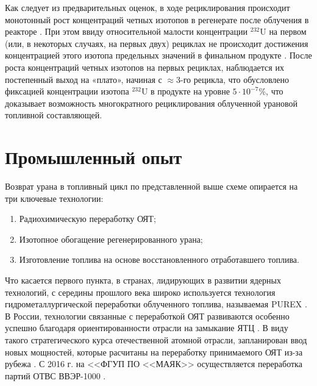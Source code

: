 Как следует из предварительных оценок, в ходе рециклирования происходит монотонный рост концентраций четных изотопов в регенерате после облучения в реакторе \cite{smirnovEvolutionIsotopicComposition2012}. При этом ввиду относительной малости концентрации $^{232}$U на первом (или, в некоторых случаях, на первых двух) рециклах не происходит достижения концентрацией этого изотопа предельных значений в финальном продукте \cite{smirnovApplyingEnrichmentCapacities2018}.
После роста концентраций четных изотопов на первых рециклах, наблюдается их постепенный выход на «плато», начиная с $\approx$3-го рецикла, что обусловлено фиксацией концентрации изотопа $^{232}$U в продукте на уровне $5\cdot10^{-7}$\%, что доказывает возможность многократного рециклирования облученной урановой топливной составляющей.


\section{Промышленный опыт}\label{sec:ch1/sec1}

Возврат урана в топливный цикл по представленной выше схеме опирается на три ключевые технологии:
\begin{enumerate}
  \item Радиохимическую переработку ОЯТ;
  \item Изотопное обогащение регенерированного урана;
  \item Изготовление топлива на основе восстановленного отработавшего топлива.
\end{enumerate}

Что касается первого пункта, в странах, лидирующих в развитии ядерных технологий, с середины прошлого века широко используется технология гидрометаллургической переработки облученного топлива, называемая PUREX \cite{selvaduraySurveyNuclearFuel1979}. В России, технологии связанные с переработкой ОЯТ развиваются особенно успешно благодаря ориентированности отрасли на замыкание ЯТЦ \cite{balihinSostoyaniiPerspektivahRazvitiya2018, efimenkoProblemyPerspektivyRazvitiya2017}. В виду такого стратегического курса отечественной атомной отрасли, запланирован ввод новых мощностей, которые расчитаны на переработку принимаемого ОЯТ из-за рубежа \cite{050519L3942005}. С 2016 г. на <<ФГУП ПО <<МАЯК>> осуществляется переработка партий ОТВС ВВЭР-1000 \cite{PyatyyNacionalnyyDoklad}.

